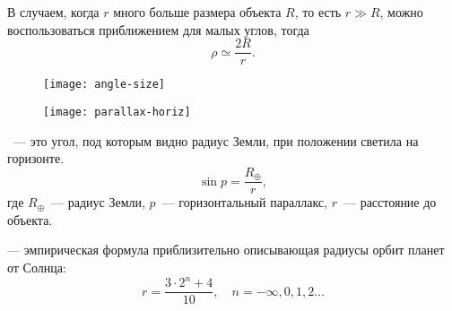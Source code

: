В случаем, когда $r$ много больше размера объекта $R$, то есть $r\gg R$, можно воспользоваться приближением для малых углов, тогда \begin{equation}
	\rho \simeq \frac{2 R}{r}.
\end{equation}

\begin{figure}[h!]
	\begin{minipage}[b]{0.49\tw}
		\centering
		\texttt{[image: angle-size]}
	\end{minipage}
	\hfill
	\begin{minipage}[b]{0.49\tw}
		\centering
		\texttt{[image: parallax-horiz]}
	\end{minipage}
\end{figure}

~--- это угол, под которым видно радиус Земли, при положении светила на горизонте.
\begin{equation}
\sin p=\frac{R_\oplus}{r},
\end{equation}
где $R_\oplus$~--- радиус Земли, $p$~--- горизонтальный параллакс, $r$~--- 
расстояние до объекта.

 --- эмпирическая формула приблизительно описывающая 
радиусы орбит планет от Солнца:
\begin{equation}r=\frac{3\cdot 2^n+4}{10}, \quad n=-\infty, 0, 1, 2...
\end{equation}

